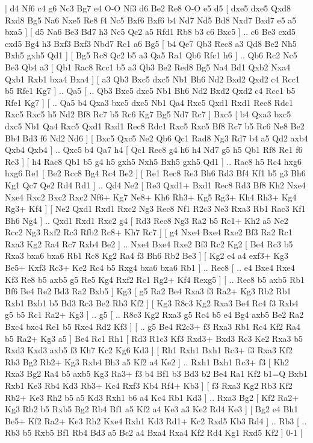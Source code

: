 \makegametitle 
|   d4   Nf6    c4   g6    Nc3   Bg7    e4   O-O    Nf3   d6   Be2  Re8   O-O   e5    d5 [  dxe5 dxe5  Qxd8 Rxd8  Bg5 Na6  Nxe5 Re8  f4 Nc5  Bxf6 Bxf6  b4 Nd7  Nd5 Bd8  Nxd7 Bxd7  e5 a5  bxa5   ]  [  d5 Na6  Be3 Bd7  h3 Nc5  Qc2 a5  Rfd1 Rb8  b3 c6  Bxc5   ] .. c6    Be3   cxd5    cxd5   Bg4    h3   Bxf3    Bxf3   Nbd7    Rc1   a6    Bg5 [  b4 Qe7  Qb3 Rec8  a3 Qd8  Be2 Nh5  Bxh5 gxh5  Qd1   ]  [  Bg5 Rc8  Qc2 b5  a3 Qa5  Ra1 Qb6  Rfc1 h6   ] .. Qb6    Rc2   Nc5    Be3   Qb4    a3    [  Qb1 Rac8  Rcc1 b5  a3 Qb3  Be2 Red8  Bg5 Na4  Bd1 Qxb2  Nxa4 Qxb1  Rxb1 bxa4  Bxa4   ]  [  a3 Qb3  Bxc5 dxc5  Nb1 Bh6  Nd2 Bxd2  Qxd2 c4  Rcc1 b5  Rfe1 Kg7   ] .. Qa5 [ .. Qb3  Bxc5 dxc5  Nb1 Bh6  Nd2 Bxd2  Qxd2 c4  Rcc1 b5  Rfe1 Kg7   ]  [ .. Qa5  b4 Qxa3  bxc5 dxc5  Nb1 Qa4  Rxc5 Qxd1  Rxd1 Rec8  Rdc1 Rxc5  Rxc5 h5  Nd2 Bf8  Rc7 b5  Rc6 Kg7  Bg5 Nd7  Rc7   ]  Bxc5 [  b4 Qxa3  bxc5 dxc5  Nb1 Qa4  Rxc5 Qxd1  Rxd1 Rec8  Rdc1 Rxc5  Rxc5 Bf8  Rc7 b5  Rc6 Ne8  Be2 Bb4  Bd3 f6  Nd2 Nd6   ]  [  Bxc5 Qxc5  Ne2 Qb6  Qc1 Rad8  Ng3 Rd7  b4 a5  Qd2 axb4  Qxb4 Qxb4   ] .. Qxc5    b4   Qa7    h4 [  Qc1 Rec8  g4 h6  h4 Nd7  g5 h5  Qb1 Rf8  Re1 f6  Re3   ]  [  h4 Rac8  Qb1 b5  g4 h5  gxh5 Nxh5  Bxh5 gxh5  Qd1   ] .. Rac8    h5   Rc4    hxg6   hxg6    Re1 [  Be2 Rcc8  Bg4 Rc4  Be2   ]  [  Re1 Rec8  Re3 Bh6  Rd3 Bf4  Kf1 b5  g3 Bh6  Kg1 Qc7  Qe2 Rd4  Rd1   ] .. Qd4    Ne2 [  Re3 Qxd1+  Bxd1 Rec8  Rd3 Bf8  Kh2 Nxe4  Nxe4 Rxc2  Bxc2 Rxc2  Nf6+ Kg7  Ne8+ Kh6  Rh3+ Kg5  Rg3+ Kh4  Rh3+ Kg4  Rg3+ Kf4   ]  [  Ne2 Qxd1  Rxd1 Rxc2  Ng3 Rec8  Nf1 R2c3  Ne3 Rxa3  Rb1 Rac3  Kf1 Bh6  Ng4   ] .. Qxd1    Rxd1   Rxc2    g4 [  Rd3 Rec8  Ng3 Ra2  b5 Rc1+  Kh2 a5  Ne2 Rcc2  Ng3 Rxf2  Rc3 Rfb2  Rc8+ Kh7  Rc7   ]  [  g4 Nxe4  Bxe4 Rxe2  Bf3 Ra2  Rc1 Rxa3  Kg2 Ra4  Rc7 Rxb4  Be2   ] .. Nxe4    Bxe4   Rxe2    Bf3   Rc2    Kg2 [  Be4 Rc3  b5 Rxa3  bxa6 bxa6  Rb1 Rc8  Kg2 Ra4  f3 Bh6  Rb2 Be3   ]  [  Kg2 e4  a4 exf3+  Kg3 Be5+  Kxf3 Rc3+  Ke2 Rc4  b5 Rxg4  bxa6 bxa6  Rb1   ] .. Rec8 [ .. e4  Bxe4 Rxe4  Kf3 Re8  b5 axb5  g5 Re5  Kg4 Rxf2  Rc1 Rg2+  Kf4 Rexg5   ]  [ .. Rec8  b5 axb5  Rb1 Bf6  Be4 Re2  Bd3 Ra2  Bxb5   ]  Kg3 [  g5 Ra2  Be4 Rxa3  f3 Ra2+  Kg3 Rb2  Rb1 Rxb1  Bxb1 b5  Bd3 Rc3  Be2 Rb3  Kf2   ]  [  Kg3 R8c3  Kg2 Rxa3  Be4 Rc4  f3 Rxb4  g5 b5  Rc1 Ra2+  Kg3   ] .. g5 [ .. R8c3  Kg2 Rxa3  g5 Rc4  b5 e4  Bg4 axb5  Be2 Ra2  Bxc4 bxc4  Re1 b5  Rxe4 Rd2  Kf3   ]  [ .. g5  Be4 R2c3+  f3 Rxa3  Rb1 Rc4  Kf2 Ra4  b5 Ra2+  Kg3 a5   ]  Be4   Rc1    Rh1 [  Rd3 R1c3  Kf3 Rxd3+  Bxd3 Rc3  Ke2 Rxa3  b5 Rxd3  Kxd3 axb5  f3 Kh7  Kc2 Kg6  Kd3   ]  [  Rh1 Rxh1  Bxh1 Rc3+  f3 Rxa3  Kf2 Rb3  Bg2 Rb2+  Kg3 Rxb4  Bh3 a5  Kf2 a4  Ke2   ] .. Rxh1    Bxh1   Rc3+    f3 [  Kh2 Rxa3  Bg2 Ra4  b5 axb5  Kg3 Ra3+  f3 b4  Bf1 b3  Bd3 b2  Be4 Ra1  Kf2 b1=Q  Bxb1 Rxb1  Ke3 Rb4  Kd3 Rb3+  Kc4 Rxf3  Kb4 Rf4+  Kb3   ]  [  f3 Rxa3  Kg2 Rb3  Kf2 Rb2+  Ke3 Rh2  b5 a5  Kd3 Rxh1  b6 a4  Kc4 Rb1  Kd3   ] .. Rxa3    Bg2 [  Kf2 Ra2+  Kg3 Rb2  b5 Rxb5  Bg2 Rb4  Bf1 a5  Kf2 a4  Ke3 a3  Ke2 Rd4  Ke3   ]  [  Bg2 e4  Bh1 Be5+  Kf2 Ra2+  Ke3 Rh2  Kxe4 Rxh1  Kd3 Rd1+  Kc2 Rxd5  Kb3 Rd4   ] .. Rb3    [ .. Rb3  b5 Rxb5  Bf1 Rb4  Bd3 a5  Bc2 a4  Bxa4 Rxa4  Kf2 Rd4  Kg1 Rxd5  Kf2   ] 0-1  |
